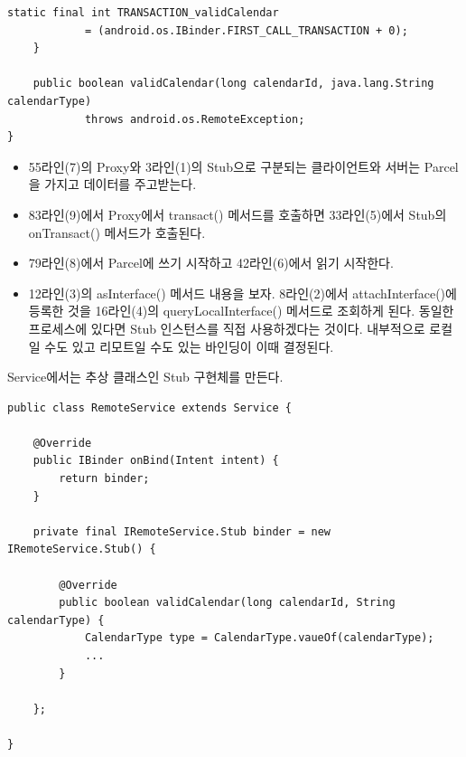 \begin{lstlisting}[frame=single]
		static final int TRANSACTION_validCalendar 
			= (android.os.IBinder.FIRST_CALL_TRANSACTION + 0);
	}

	public boolean validCalendar(long calendarId, java.lang.String calendarType)
			throws android.os.RemoteException;
}
\end{lstlisting}
\begin{itemize}
\item 55라인(7)의 Proxy와 3라인(1)의 Stub으로 구분되는 클라이언트와 서버는 Parcel을 가지고 데이터를 주고받는다. 
\item 83라인(9)에서 Proxy에서 transact() 메서드를 호출하면 33라인(5)에서 Stub의 onTransact() 메서드가 호출된다.
\item 79라인(8)에서 Parcel에 쓰기 시작하고 42라인(6)에서 읽기 시작한다.
\item 12라인(3)의 asInterface() 메서드 내용을 보자. 8라인(2)에서 attachInterface()에 등록한 것을 16라인(4)의 queryLocalInterface() 메서드로 조회하게 된다. 동일한 프로세스에 있다면 Stub 인스턴스를 직접 사용하겠다는 것이다. 내부적으로 로컬일 수도 있고 리모트일 수도 있는 바인딩이 이때 결정된다.
\end{itemize}

Service에서는 추상 클래스인 Stub 구현체를 만든다.
\begin{lstlisting}[frame=single]
public class RemoteService extends Service {

 	@Override
    public IBinder onBind(Intent intent) {
		return binder;
	}
    	
	private final IRemoteService.Stub binder = new IRemoteService.Stub() {
	
		@Override
        public boolean validCalendar(long calendarId, String calendarType) {
			CalendarType type = CalendarType.vaueOf(calendarType);
            ...
        }
        
    }; 
    
}       	
\end{lstlisting}

